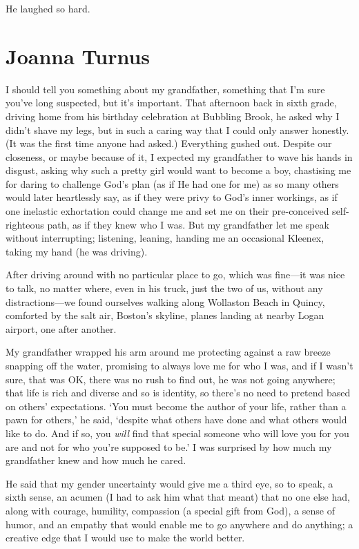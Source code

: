 He laughed so hard.

\chapter{Joanna Turnus}

\titlemark

I should tell you something about my grandfather, something that I'm
sure you've long suspected, but it's important. That afternoon back in
sixth grade, driving home from his birthday celebration at Bubbling
Brook, he asked why I didn't shave my legs, but in such a caring way
that I could only answer honestly. (It was the first time anyone had
asked.) Everything gushed out. Despite our closeness, or maybe because
of it, I expected my grandfather to wave his hands in disgust, asking
why such a pretty girl would want to become a boy, chastising me for
daring to challenge God's plan (as if He had one for me) as so many
others would later heartlessly say, as if they were privy to God's inner
workings, as if one inelastic exhortation could change me and set me on
their pre-conceived self-righteous path, as if they knew who I was. But
my grandfather let me speak without interrupting; listening, leaning,
handing me an occasional Kleenex, taking my hand (he was driving).

After driving around with no particular place to go, which was fine---it
was nice to talk, no matter where, even in his truck, just the two of
us, without any distractions---we found ourselves walking along
Wollaston Beach in Quincy, comforted by the salt air, Boston's skyline,
planes landing at nearby Logan airport, one after another.

My grandfather wrapped his arm around me protecting against a raw breeze
snapping off the water, promising to always love me for who I was, and
if I wasn't sure, that was OK, there was no rush to find out, he was not
going anywhere; that life is rich and diverse and so is identity, so
there's no need to pretend based on others' expectations. `You must
become the author of your life, rather than a pawn for others,' he said,
`despite what others have done and what others would like to do. And if
so, you \emph{will} find that special someone who will love you for you
are and not for who you're supposed to be.' I was surprised by how much
my grandfather knew and how much he cared.

He said that my gender uncertainty would give me a third eye, so to
speak, a sixth sense, an acumen (I had to ask him what that meant) that
no one else had, along with courage, humility, compassion (a special
gift from God), a sense of humor, and an empathy that would enable me to
go anywhere and do anything; a creative edge that I would use to make
the world better.


